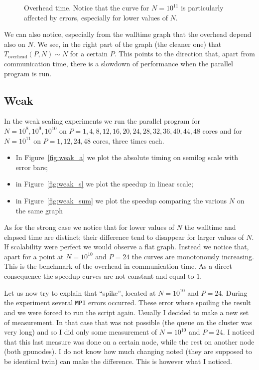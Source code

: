 \documentclass[11pt,a4paper]{article}
\numberwithin{equation}{section}
\begin{document}
\begin{figure}[h!]
    \centering
    
    \caption{Overhead time. Notice that the curve for $N = 10^{11}$ is particularly affected by errors, especially for lower values of $N$.}
    \label{fig:overhead}
\end{figure}

We can also notice, especially from the walltime graph that the overhead depend also on $N$. We see, in the right part of the graph (the cleaner one) that $T_{\text{overhead}}(P,N) \sim N$ for a certain $P$. This points to the direction that, apart from communication time, there is a slowdown of performance when the parallel program is run.

\subsection{Weak}
In the weak scaling experiments we run the parallel program for $N = 10^8, 10^9, 10^{10}$ on $P = 1, 4, 8, 12, 16, 20, 24, 28, 32, 36, 40, 44, 48$ cores and for $N = 10^{11}$ on $P= 1, 12, 24, 48$ cores, three times each. 
\begin{itemize}
    \item In Figure~\ref{fig:weak_a} we plot the absolute timing on semilog scale with error bars;
    \item in Figure~\ref{fig:weak_s} we plot the speedup in linear scale;
    \item in Figure~\ref{fig:weak_sum} we plot the speedup comparing the various $N$ on the same graph
\end{itemize}
As for the strong case we notice that for lower values of $N$ the walltime and elapsed time are distinct; their difference tend to disappear for larger values of $N$. If scalability were perfect we would observe a flat graph. Instead we notice that, apart for a point at $N=10^{10}$ and $P=24$ the curves are monotonously increasing. This is the benchmark of the overhead in communication time.
As a direct consequence the speedup curves are not constant and equal to $1$.

Let us now try to explain that ``spike'', located at $N=10^{10}$ and $P=24$. During the experiment several \texttt{MPI} errors occurred. These error where spoiling the result and we were forced to run the script again. Usually I decided to make a new set of measurement. In that case that was not possible (the queue on the cluster was very long) and so I did only some measurement of $N=10^{10}$ and $P=24$. I noticed that this last measure was done on a certain node, while the rest on another node (both gpunodes). I do not know how much changing noted (they are supposed to be identical twin) can make the difference. This is however what I noticed.
\end{document}
